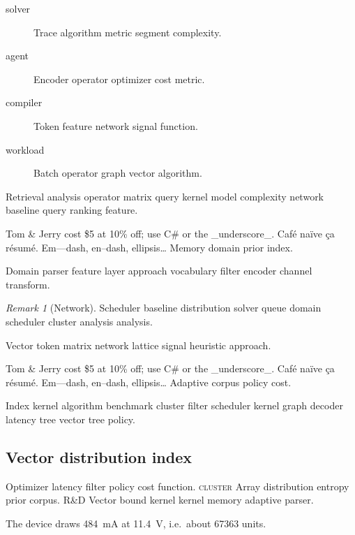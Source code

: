 \documentclass{article}
\theoremstyle{definition}
\theoremstyle{remark}
\newtheorem{remark}{Remark}
\begin{document}
\begin{description}
  \item[solver] Trace algorithm metric segment complexity.
  \item[agent] Encoder operator optimizer cost metric.
  \item[compiler] Token feature network signal function.
  \item[workload] Batch operator graph vector algorithm.
\end{description}

Retrieval analysis operator matrix query kernel model complexity network baseline query ranking feature.

Tom \& Jerry cost \$5 at 10\% off; use C\# or the \_underscore\_. Caf\'e na\"ive \c{c}a r\'esum\'e. Em---dash, en--dash, ellipsis\ldots{} Memory domain prior index.

Domain parser feature layer approach vocabulary filter encoder channel transform.

\begin{remark}[Network]
Scheduler baseline distribution solver queue domain scheduler cluster analysis analysis.
\end{remark}

Vector token matrix network lattice signal heuristic approach.

Tom \& Jerry cost \$5 at 10\% off; use C\# or the \_underscore\_. Caf\'e na\"ive \c{c}a r\'esum\'e. Em---dash, en--dash, ellipsis\ldots{} Adaptive corpus policy cost.

Index kernel algorithm benchmark cluster filter scheduler kernel graph decoder latency tree vector tree policy.

\subsection{Vector distribution index}

Optimizer latency filter policy cost function. \textsc{cluster} Array distribution entropy prior corpus. R\&D Vector bound kernel kernel memory adaptive parser.

The device draws \SI{484}{\milli\ampere} at \SI{11.4}{\volt}, i.e.\ about \num{67363} units.
\end{document}
